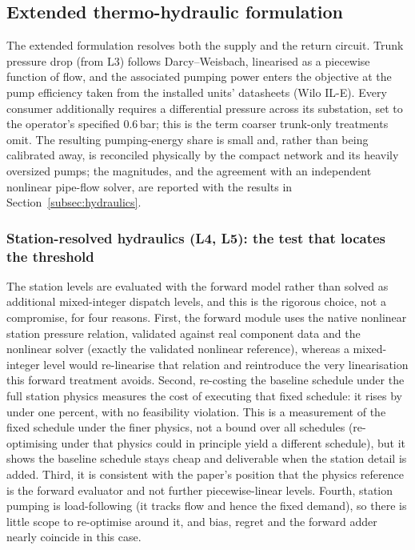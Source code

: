 \documentclass[a4paper,fleqn]{cas-sc}
\newcommand{\Lthree}{\ensuremath{\mathrm{L3}}}  %
\newcommand{\new}[1]{\textcolor[HTML]{1A5FB4}{#1}}   %
\newcommand{\new}[1]{#1}
\begin{document}
\subsection{Extended thermo-hydraulic formulation}\label{sec:extended}
\new{}
The extended formulation resolves both the supply and the return circuit. Trunk pressure drop
(from $\Lthree$) follows Darcy--Weisbach, linearised as a piecewise function of flow, and the
associated pumping power enters the objective at the pump efficiency taken from the installed
units' datasheets (Wilo IL-E). Every consumer additionally requires a differential pressure
across its substation, set to the operator's specified $0.6$\,bar; this is the term coarser
trunk-only treatments omit. The resulting pumping-energy share is small and, rather than being
calibrated away, is reconciled physically by the compact network and its heavily oversized pumps;
the magnitudes, and the agreement with an independent nonlinear pipe-flow solver, are reported
with the results in Section~\ref{subsec:hydraulics}.

\subsubsection{Station-resolved hydraulics (L4, L5): the test that locates the threshold}\label{subsec:stationhyd}
The station levels are evaluated with the forward model rather than solved as additional
mixed-integer dispatch levels, and this is the rigorous choice, not a compromise, for four
reasons. First, the forward module uses the native nonlinear station pressure relation,
validated against real component data and the nonlinear solver (exactly the validated
nonlinear reference), whereas a mixed-integer level would re-linearise
that relation and reintroduce the very linearisation this forward treatment avoids. Second,
re-costing the baseline schedule under the full station physics measures the cost of executing
that fixed schedule: it rises by under one percent, with no feasibility violation. This is a
measurement of the fixed schedule under the finer physics, not a bound over all schedules
(re-optimising under that physics could in principle yield a different schedule), but it shows
the baseline schedule stays cheap and deliverable when the station detail is added. Third, it is consistent with the paper's position that the physics
reference is the forward evaluator and not further piecewise-linear levels. Fourth, station
pumping is load-following (it tracks flow and hence the fixed demand), so there is little scope
to re-optimise around it, and bias, regret and the forward adder nearly coincide in this case.
\end{document}
